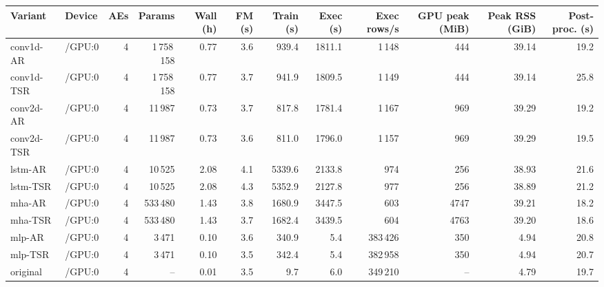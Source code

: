 \begin{table}[t]
  \centering
  \footnotesize
  \begin{tabular}{@{}llrrrrrrrrrr@{}}
  \toprule
  Variant & Device & AEs & Params & Wall (h) & FM (s) & Train (s) & Exec (s) & Exec rows/s & GPU peak (MiB) & Peak RSS (GiB) & Post-proc. (s) \\
  \midrule
  conv1d-AR & /GPU:0 & 4 & 1\,758\,158 & 0.77 & 3.6 & 939.4 & 1811.1 & 1\,148 & 444 & 39.14 & 19.2 \\
  conv1d-TSR & /GPU:0 & 4 & 1\,758\,158 & 0.77 & 3.7 & 941.9 & 1809.5 & 1\,149 & 444 & 39.14 & 25.8 \\
  conv2d-AR & /GPU:0 & 4 & 11\,987 & 0.73 & 3.7 & 817.8 & 1781.4 & 1\,167 & 969 & 39.29 & 19.2 \\
  conv2d-TSR & /GPU:0 & 4 & 11\,987 & 0.73 & 3.6 & 811.0 & 1796.0 & 1\,157 & 969 & 39.29 & 19.5 \\
  lstm-AR & /GPU:0 & 4 & 10\,525 & 2.08 & 4.1 & 5339.6 & 2133.8 & 974 & 256 & 38.93 & 21.6 \\
  lstm-TSR & /GPU:0 & 4 & 10\,525 & 2.08 & 4.3 & 5352.9 & 2127.8 & 977 & 256 & 38.89 & 21.2 \\
  mha-AR & /GPU:0 & 4 & 533\,480 & 1.43 & 3.8 & 1680.9 & 3447.5 & 603 & 4747 & 39.21 & 18.2 \\
  mha-TSR & /GPU:0 & 4 & 533\,480 & 1.43 & 3.7 & 1682.4 & 3439.5 & 604 & 4763 & 39.20 & 18.6 \\
  mlp-AR & /GPU:0 & 4 & 3\,471 & 0.10 & 3.6 & 340.9 & 5.4 & 383\,426 & 350 & 4.94 & 20.8 \\
  mlp-TSR & /GPU:0 & 4 & 3\,471 & 0.10 & 3.5 & 342.4 & 5.4 & 382\,958 & 350 & 4.94 & 20.7 \\
  original & /GPU:0 & 4 & -- & 0.01 & 3.5 & 9.7 & 6.0 & 349\,210 & -- & 4.79 & 19.7 \\

\end{tabular}
\end{table}
